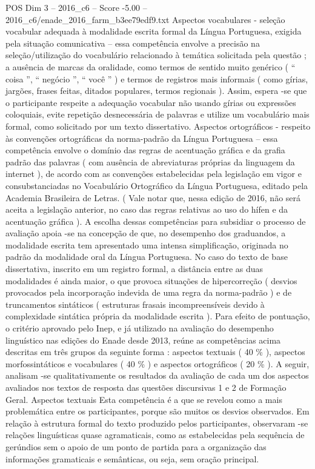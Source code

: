 \begin{textsample}{POS Dim 3 – 2016\_c6 – Score -5.00 – 2016\_c6/enade\_2016\_farm\_b3ee79edf9.txt}
Aspectos vocabulares - seleção vocabular adequada à modalidade escrita formal da Língua Portuguesa, exigida pela situação comunicativa – essa competência envolve a precisão na seleção/utilização do vocabulário relacionado à temática solicitada pela questão ; a ausência de marcas da oralidade, como termos de sentido muito genérico ( “ coisa ”, “ negócio ”, “ você ” ) e termos de registros mais informais ( como gírias, jargões, frases feitas, ditados populares, termos regionais ).
Assim, espera -se que o participante respeite a adequação vocabular não usando gírias ou expressões coloquiais, evite repetição desnecessária de palavras e utilize um vocabulário mais formal, como solicitado por um texto dissertativo.
Aspectos ortográficos - respeito às convenções ortográficas da norma-padrão da Língua Portuguesa – essa competência envolve o domínio das regras de acentuação gráfica e da grafia padrão das palavras ( com ausência de abreviaturas próprias da linguagem da internet ), de acordo com as convenções estabelecidas pela legislação em vigor e consubstanciadas no Vocabulário Ortográfico da Língua Portuguesa, editado pela Academia Brasileira de Letras. ( Vale notar que, nessa edição de 2016, não será aceita a legislação anterior, no caso das regras relativas ao uso do hífen e da acentuação gráfica ).
A escolha dessas competências para subsidiar o processo de avaliação apoia -se na concepção de que, no desempenho dos graduandos, a modalidade escrita tem apresentado uma intensa simplificação, originada no padrão da modalidade oral da Língua Portuguesa.
No caso do texto de base dissertativa, inscrito em um registro formal, a distância entre as duas modalidades é ainda maior, o que provoca situações de hipercorreção ( desvios provocados pela incorporação indevida de uma regra da norma-padrão ) e de truncamentos sintáticos ( estruturas frasais incompreensíveis devido à complexidade sintática própria da modalidade escrita ).
Para efeito de pontuação, o critério aprovado pelo Inep, e já utilizado na avaliação do desempenho linguístico nas edições do Enade desde 2013, reúne as competências acima descritas em três grupos da seguinte forma : aspectos textuais ( 40 \% ), aspectos morfossintáticos e vocabulares ( 40 \% ) e aspectos ortográficos ( 20 \% ).
A seguir, analisam -se qualitativamente os resultados da avaliação de cada um dos aspectos avaliados nos textos de resposta das questões discursivas 1 e 2 de Formação Geral.
Aspectos textuais Esta competência é a que se revelou como a mais problemática entre os participantes, porque são muitos os desvios observados.
Em relação à estrutura formal do texto produzido pelos participantes, observaram -se relações linguísticas quase agramaticais, como as estabelecidas pela sequência de gerúndios sem o apoio de um ponto de partida para a organização das informações gramaticais e semânticas, ou seja, sem oração principal.

\end{textsample}
